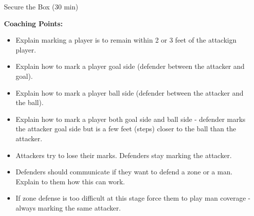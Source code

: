\begin{evenBlock}{Secure the Box (30 min)}
\begin{minipage}[t]{\linewidth}
\begin{minipage}{.6\linewidth}
        \textbf{Coaching Points:}
        \begin{itemize}
            \setlength{\itemsep}{0pt}
            \setlength{\parskip}{0pt}
            \setlength{\parsep}{0pt}
            \item Explain marking a player is to remain within 2 or 3 feet of the attackign player.
            \item Explain how to mark a player goal side (defender between the attacker and goal).
            \item Explain how to mark a player ball side (defender between the attacker and the ball).
            \item Explain how to mark a player both goal side and ball side - defender marks the attacker goal side but is a few feet (steps) closer to the ball than the attacker.
            \item Attackers try to lose their marks.  Defenders stay marking the attacker.
            \item Defenders should communicate if they want to defend a zone or a man.  Explain to them how this can work.
            \item If zone defense is too difficult at this stage force them to play man coverage - always marking the same attacker.
        \end{itemize}

    \end{minipage}
\end{minipage}

\end{evenBlock}